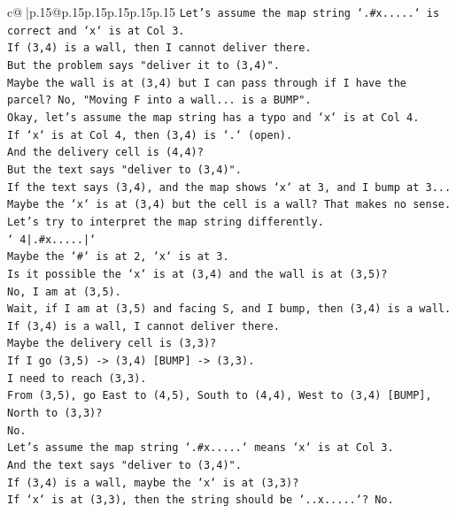 \documentclass{article}
\begin{document}
{\begin{supertabular}{c@{$\;$}|p{.15\linewidth}@{}p{.15\linewidth}p{.15\linewidth}p{.15\linewidth}p{.15\linewidth}p{.15\linewidth}}
{{{\texttt{Let's assume the map string `.\#x.....` is correct and `x` is at Col 3.} \\
\texttt{If (3,4) is a wall, then I cannot deliver there.} \\
\texttt{But the problem says "deliver it to (3,4)".} \\
\texttt{Maybe the wall is at (3,4) but I can pass through if I have the parcel? No, "Moving F into a wall... is a BUMP".} \\
\texttt{Okay, let's assume the map string has a typo and `x` is at Col 4.} \\
\texttt{If `x` is at Col 4, then (3,4) is `.` (open).} \\
\texttt{And the delivery cell is (4,4)?} \\
\texttt{But the text says "deliver to (3,4)".} \\
\texttt{If the text says (3,4), and the map shows `x` at 3, and I bump at 3...} \\
\texttt{Maybe the `x` is at (3,4) but the cell is a wall? That makes no sense.} \\
\texttt{Let's try to interpret the map string differently.} \\
\texttt{` 4|.\#x.....|`} \\
\texttt{Maybe the `\#` is at 2, `x` is at 3.} \\
\texttt{Is it possible the `x` is at (3,4) and the wall is at (3,5)?} \\
\texttt{No, I am at (3,5).} \\
\texttt{Wait, if I am at (3,5) and facing S, and I bump, then (3,4) is a wall.} \\
\texttt{If (3,4) is a wall, I cannot deliver there.} \\
\texttt{Maybe the delivery cell is (3,3)?} \\
\texttt{If I go (3,5) {-}> (3,4) {[}BUMP{]} {-}> (3,3).} \\
\texttt{I need to reach (3,3).} \\
\texttt{From (3,5), go East to (4,5), South to (4,4), West to (3,4) {[}BUMP{]}, North to (3,3)?} \\
\texttt{No.} \\
\texttt{Let's assume the map string `.\#x.....` means `x` is at Col 3.} \\
\texttt{And the text says "deliver to (3,4)".} \\
\texttt{If (3,4) is a wall, maybe the `x` is at (3,3)?} \\
\texttt{If `x` is at (3,3), then the string should be `..x.....`? No.} \\
}}}
\end{supertabular}}
\end{document}
